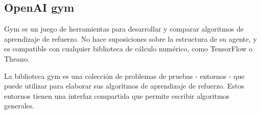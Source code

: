 \subsection{OpenAI gym}

Gym es un juego de herramientas para desarrollar y comparar algoritmos de aprendizaje de refuerzo. No hace suposiciones sobre la estructura de su agente, y es compatible con cualquier biblioteca de cálculo numérico, como TensorFlow o Theano.

La biblioteca gym es una colección de problemas de pruebas - entornos - que puede utilizar para elaborar sus algoritmos de aprendizaje de refuerzo. Estos entornos tienen una interfaz compartida que permite escribir algoritmos generales.